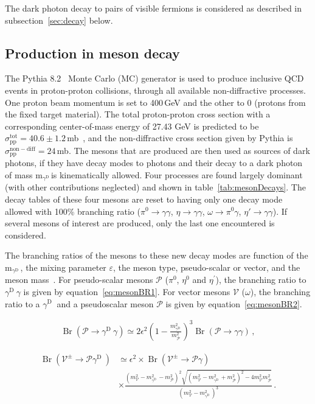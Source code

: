 \documentclass[12pt,a4paper,]{article}
\newcommand{\mathDP}{\gamma^{\mathrm{D}}\ }
\newcommand{\DP}{$\mathDP$}
\newcommand{\mDP}{m$_{\mathDP}$}
\newcommand{\Br}{\mathop\mathrm{Br}}
\begin{document}
The dark photon decay to pairs of visible fermions is considered as
described in subsection~\ref{sec:decay} below.


\subsection{Production in meson decay}
\label{sec:meson}

The Pythia 8.2~\cite{Sjostrand:2014zea} Monte Carlo (MC) generator is
used to produce inclusive QCD events in proton-proton collisions,
through all available non-diffractive processes. One proton beam
momentum is set to 400\,GeV and the other to 0 (protons from the fixed
target material). The total proton-proton cross section with a
corresponding center-of-mass energy of 27.43 GeV is predicted to be
$\sigma_{\mathrm{pp}}^{\mathrm{tot}} = 40.6 \pm
1.2$\,mb~\cite{Patrignani:2016xqp}, and the non-diffractive cross
section given by Pythia is $\sigma_{\mathrm{pp}}^{\mathrm{non-diff}} =
24$\,mb. The mesons that are produced are then used as sources of dark
photons, if they have decay modes to photons and their decay to a dark
photon of mass \mDP is kinematically allowed. Four processes are found
largely dominant (with other contributions neglected) and shown in
table~\ref{tab:mesonDecays}. The decay tables of these four mesons are
reset to having only one decay mode allowed with 100\% branching ratio
($\pi^{0}\rightarrow \gamma\gamma $, $\eta\rightarrow \gamma\gamma $,
$\omega\rightarrow \pi^{0}\gamma $, $\eta'\rightarrow \gamma\gamma
$). If several mesons of interest are produced, only the last one
encountered is considered.

The branching ratios of the mesons to these new decay modes are
function of the \mDP, the mixing parameter $\varepsilon$, the meson
type, pseudo-scalar or vector, and the meson
mass~\cite{Batell:2009di,Gorbunov:2014wqa}. For pseudo-scalar mesons
$\mathcal{P}$ ($\pi^0$, $\eta^0$ and $\eta^{\prime}$), the branching
ratio to \DP$\gamma$ is given by equation~\ref{eq:mesonBR1}. For
vector mesons $\mathcal{V}$ ($\omega$), the branching ratio to a \DP
and a pseudoscalar meson $\mathcal{P}$ is given by
equation~\ref{eq:mesonBR2}.

\begin{align}
	\Br(\mathcal{P}\to \mathDP \gamma)\simeq 2\epsilon^2\left ( 1-\frac{m_{\mathDP}^2}{m_{\mathcal{P}}^2} \right )^3 \Br(\mathcal{P}\to\gamma\gamma)\,,\label{eq:mesonBR1}
\end{align}

\begin{align}
\Br(\mathcal{V}^\pm\to \mathcal{P} \mathDP ) & \simeq \epsilon^2\times \Br(\mathcal{V}^\pm\to \mathcal{P} \gamma)\label{eq:mesonBR2} \\ 
&\times\frac{(m_{\mathcal{V}}^2-m_{\mathDP}^2-m_{\mathcal{P}}^2)^2\sqrt{(m_{\mathcal{V}}^2-m_{\mathDP}^2+m_{\mathcal{P}}^2)^2-4m_{\mathcal{V}}^2m_{\mathcal{P}}^2}}{(m_{\mathcal{V}}^2-m_{\mathDP}^2)^3}\,.\nonumber
\end{align}
\end{document}
